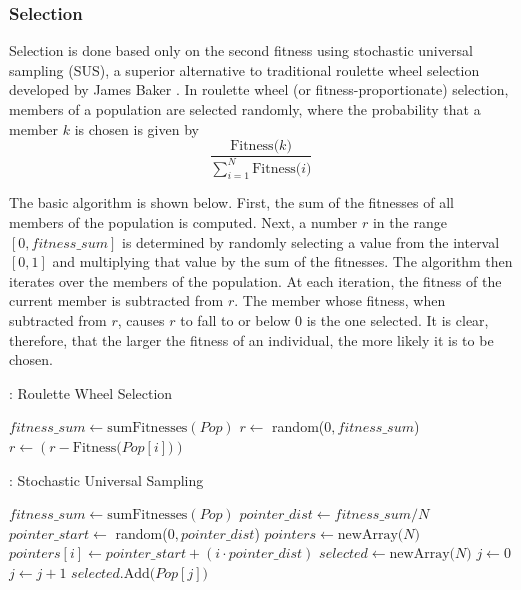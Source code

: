 \documentclass[12pt,twoside]{article}
\begin{document}
\subsubsection{Selection}

Selection is done based only on the second fitness using stochastic universal sampling (SUS), a superior alternative to traditional roulette wheel selection developed by James Baker \cite{j_reducing_1987}. In roulette wheel (or fitness-proportionate) selection, members of a population are selected randomly, where the probability that a member $k$ is chosen is given by
$$ \frac{\text{Fitness($k$)}}{\sum_{i=1}^N\text{Fitness($i$)}}$$

The basic algorithm is shown below. First, the sum of the fitnesses of all members of the population is computed. Next, a number $r$ in the range $[0, fitness\_sum]$ is determined by randomly selecting a value from the interval $[0,1]$ and multiplying that value by the sum of the fitnesses. The algorithm then iterates over the members of the population. At each iteration, the fitness of the current member is subtracted from $r$. The member whose fitness, when subtracted from $r$, causes $r$ to fall to or below 0 is the one selected. It is clear, therefore, that the larger the fitness of an individual, the more likely it is to be chosen.
\begin{algorithm}
\caption[Roulette Wheel Selection]{: Roulette Wheel Selection}
\label{rws}
\begin{algorithmic}
\State $fitness\_sum \gets \text{sumFitnesses}(Pop)$
\State $r \gets$ random($0,fitness\_sum$)
\State $r \gets (r - \text{Fitness($Pop[i]$)})$
\State {}
\EndIf
\EndFor
\State {}
\EndFunction
\end{algorithmic}
\end{algorithm}

\begin{algorithm}
\caption[Stochastic Universal Sampling]{: Stochastic Universal Sampling}
\label{sus}
\begin{algorithmic}
\State $fitness\_sum \gets \text{sumFitnesses}(Pop)$
\State $pointer\_dist \gets fitness\_sum/N$
\State $pointer\_start \gets$ random($0,pointer\_dist$)
\State $pointers \gets \text{newArray($N $)}$
\State $pointers[i] \gets pointer\_start + (i \cdot pointer\_dist)$
\EndFor
\State $selected \gets \text{newArray($N$)}$
\State $j \gets 0$
\State $j \gets j + 1$
\EndWhile
\State $selected.\text{Add($Pop[j]$)}$
\EndFor
\EndFunction
\end{algorithmic}
\end{algorithm}
\end{document}
